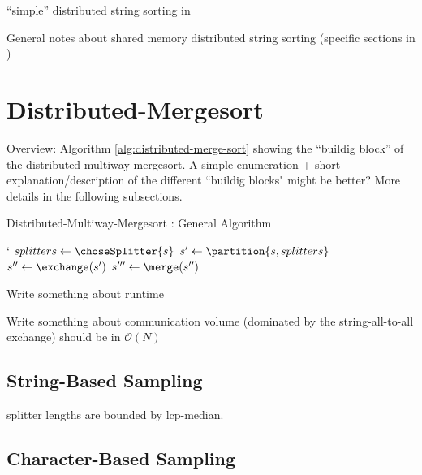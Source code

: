 \documentclass[12pt,a4paper,twoside]{scrartcl}
\numberwithin{equation}{section}
\begin{document}
``simple'' distributed string sorting in \cite{fischer2019lightweight}

General notes about shared memory distributed string sorting (specific sections in \cite{bingmann2018scalable})



\section{Distributed-Mergesort}

Overview: Algorithm \ref{alg:distributed-merge-sort} showing the ``buildig block'' of the distributed-multiway-mergesort. A simple enumeration + short explanation/description of the different ``buildig blocks" might be better? More details in the following subsections.

\begin{algorithm}
	\caption{Distributed-Multiway-Mergesort : General Algorithm}\label{alg:distributed-merge-sort}
	`
	\BlankLine
	 
	$splitters \leftarrow \choseSplitter{s}$ 
	$s' \leftarrow \partition{s, splitters}$ 
	$s'' \leftarrow \exchange(s')$ \; 
	$s''' \leftarrow \merge(s'')$
	
	
\end{algorithm}

Write something about runtime 

Write something about communication volume (dominated by the string-all-to-all exchange) should be in $\mathcal{O}(N)$


\subsection{String-Based Sampling}

splitter lengths are bounded by lcp-median.

\subsection{Character-Based Sampling}
\end{document}
